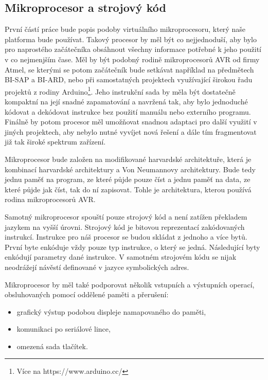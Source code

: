\subsection{Mikroprocesor a strojový kód}

První částí práce bude popis podoby virtuálního mikroprocesoru, který naše platforma bude používat. Takový procesor by měl být co nejjednoduší, aby bylo pro naprostého začátečníka obsáhnout všechny informace potřebné k jeho použití v co nejmenjším čase. Měl by být podobný rodině mikroprocesorů AVR od firmy Atmel, se kterými se potom začátečník bude setkávat například na předmětech BI-SAP a BI-ARD, nebo při samostatných projektech využívající širokou řadu projektů z rodiny Arduino\footnote{Více na https://www.arduino.cc/}. Jeho instrukční sada by měla být dostatečně kompaktní na její snadné zapamatování a navržená tak, aby bylo jednoduché kódovat a dekódovat instrukce bez použití manuálu nebo externího programu. Finálně by potom procesor měl umožňovat snadnou adaptaci pro další využití v jiných projektech, aby nebylo nutné vyvíjet nová řešení a dále tím fragmentovat již tak široké spektrum zařízení.

Mikroprocesor bude založen na modifikované harvardské architektuře, která je kombinací harvardské architektury a Von Neumannovy architektury. Bude tedy jednu paměť na program, ze které půjde pouze číst a jednu paměť na data, ze které půjde jak číst, tak do ní zapisovat. Tohle je architektura, kterou používá rodina mikroprocesorů AVR\cite{attiny12-datasheet}.

Samotný mikroprocesor spouští pouze strojový kód a není zatížen překladem jazykem na vyšší úrovni. Strojový kód je bitovou reprezentací zakódovaných instrukcí. Instrukce pro náš procesor se budou skládat z jednoho a více bytů. První byte enkóduje vždy pouze typ instrukce, o který se jedná. Následující byty enkódují parametry dané instrukce. V samotném strojovém kódu se nijak neodrážejí návěstí definované v jazyce symbolických adres.

Mikroprocesor by měl také podporovat několik vstupních a výstupních operací, obsluhovaných pomocí oddělené paměti a přerušení:

\begin{itemize}
	\item grafický výstup podobou displeje namapovaného do paměti,
	\item komunikaci po seriálové lince,
	\item omezená sada tlačítek.
\end{itemize}


